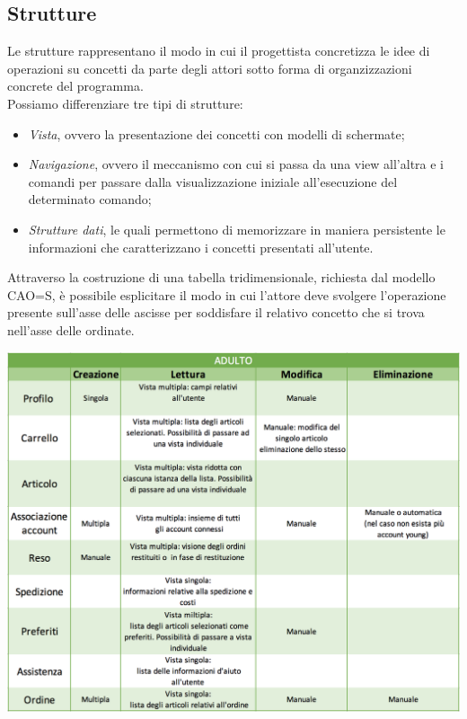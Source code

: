 \documentclass[12pt,a4paper]{report}
\begin{document}
\subsection{Strutture}
Le strutture rappresentano il modo in cui il progettista concretizza le idee di operazioni su concetti da parte degli attori sotto forma di organzizzazioni concrete del programma.\\
Possiamo differenziare tre tipi di strutture:
\begin{itemize}
\item \textit{Vista}, ovvero la presentazione dei concetti con modelli di schermate;
\item \textit{Navigazione}, ovvero il meccanismo con cui si passa da una view all'altra e i comandi per passare dalla visualizzazione iniziale all'esecuzione del determinato comando;
\item \textit{Strutture dati}, le quali permettono di memorizzare in maniera persistente le informazioni che caratterizzano i concetti presentati all'utente.
\end{itemize}
Attraverso la costruzione di una tabella tridimensionale, richiesta dal modello CAO=S, è possibile esplicitare il modo in cui l'attore deve svolgere l'operazione presente sull'asse delle ascisse per soddisfare il relativo concetto che si trova nell'asse delle ordinate.\\
\begin{center}
  \includegraphics[width=1\textwidth]{"Project Management Sources/StrutturaAdulto"}
\end{center}
\end{document}

